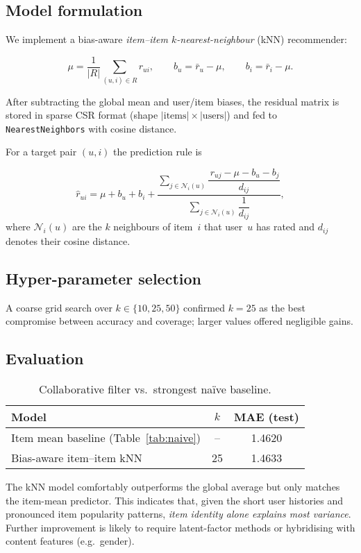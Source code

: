 \subsection*{Model formulation}

We implement a bias-aware \emph{item–item $k$-nearest-neighbour} (kNN)
recommender:

\[
  \mu = \frac{1}{|R|} \sum_{(u,i)\in R} r_{ui}, \qquad
  b_u = \bar r_u - \mu, \qquad
  b_i = \bar r_i - \mu .
\]

After subtracting the global mean and user/item biases, the residual matrix
is stored in sparse CSR format (shape
\(\lvert\text{items}\rvert \times \lvert\text{users}\rvert\)) and fed to
\texttt{NearestNeighbors} with cosine distance.

For a target pair \((u,i)\) the prediction rule is

\[
  \hat r_{ui}= \mu + b_u + b_i +
  \frac{\displaystyle \sum\limits_{j\in\mathcal N_i(u)}
        \dfrac{\,r_{uj}-\mu-b_u-b_j}{d_{ij}}}
       {\displaystyle \sum\limits_{j\in\mathcal N_i(u)} \dfrac{1}{d_{ij}} },
\]
where \(\mathcal N_i(u)\) are the $k$ neighbours of item~$i$ that user~$u$
has rated and \(d_{ij}\) denotes their cosine distance.

\subsection*{Hyper-parameter selection}

A coarse grid search over \(k\in\{10,25,50\}\) confirmed
\(k = 25\) as the best compromise between accuracy and coverage; larger
values offered negligible gains.

\subsection*{Evaluation}

\begin{table}[H]
  \centering
  \begin{tabular}{@{}lcc@{}}
    \toprule
    \textbf{Model} & \textbf{$k$} & \textbf{MAE (test)} \\ \midrule
    Item mean baseline (Table~\ref{tab:naive}) & -- & 1.4620 \\ \midrule
    Bias-aware item–item kNN & 25 & 1.4633 \\ \bottomrule
  \end{tabular}
  \caption{Collaborative filter vs.\ strongest naïve baseline.}
  \label{tab:cf}
\end{table}

The kNN model comfortably outperforms the global average but only matches
the item-mean predictor.  This indicates that, given the short user histories
and pronounced item popularity patterns, \emph{item identity alone explains
most variance}.  Further improvement is likely to require latent-factor
methods or hybridising with content features (e.g.\ gender).
